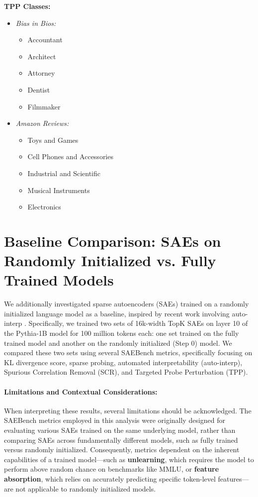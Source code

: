 \documentclass{article}
\theoremstyle{plain}
\theoremstyle{definition}
\theoremstyle{remark}
\begin{document}
\textbf{TPP Classes:}
\begin{itemize}
\item \textit{Bias in Bios:}
\begin{itemize}
\item Accountant
\item Architect
\item Attorney
\item Dentist
\item Filmmaker
\end{itemize}
\item \textit{Amazon Reviews:}
\begin{itemize}
\item Toys and Games
\item Cell Phones and Accessories
\item Industrial and Scientific
\item Musical Instruments
\item Electronics
\end{itemize}
\end{itemize}

\clearpage
\section{Baseline Comparison: SAEs on Randomly Initialized vs. Fully Trained Models}

We additionally investigated sparse autoencoders (SAEs) trained on a randomly initialized language model as a baseline, inspired by recent work involving auto-interp \citep{heap2025sparseautoencodersinterpretrandomly}. Specifically, we trained two sets of 16k-width TopK SAEs on layer 10 of the Pythia-1B model for 100 million tokens each: one set trained on the fully trained model and another on the randomly initialized (Step 0) model. We compared these two sets using several SAEBench metrics, specifically focusing on KL divergence score, sparse probing, automated interpretability (auto-interp), Spurious Correlation Removal (SCR), and Targeted Probe Perturbation (TPP).

\paragraph{Limitations and Contextual Considerations:} When interpreting these results, several limitations should be acknowledged. The SAEBench metrics employed in this analysis were originally designed for evaluating various SAEs trained on the same underlying model, rather than comparing SAEs across fundamentally different models, such as fully trained versus randomly initialized. Consequently, metrics dependent on the inherent capabilities of a trained model—such as \textbf{unlearning}, which requires the model to perform above random chance on benchmarks like MMLU, or \textbf{feature absorption}, which relies on accurately predicting specific token-level features—are not applicable to randomly initialized models.
\end{document}
